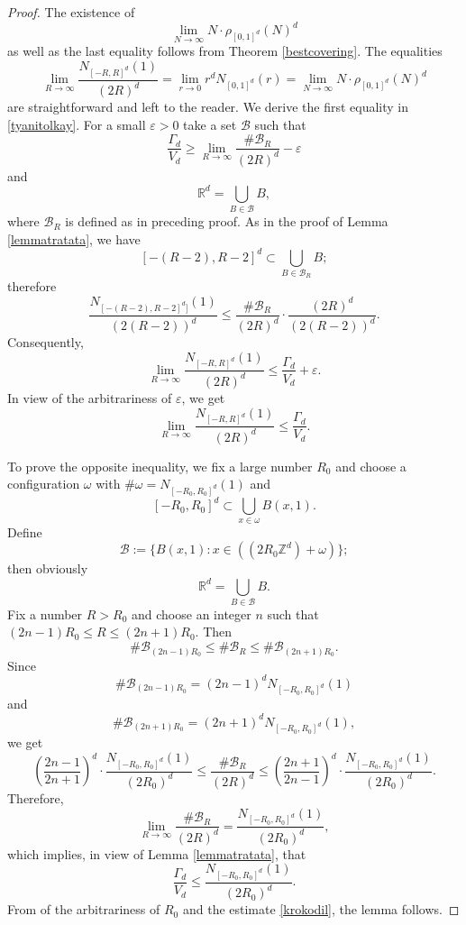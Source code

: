 \documentclass[12pt]{amsart}
\theoremstyle{definition}
\def\R{\mathbb{R}}
\def\ep{\varepsilon}
\newcommand{\1}{\mathbf{1}}
\begin{document}
\begin{proof}
The existence of 
$$
\lim_{N\to \infty} N\cdot \rho_{[0,1]^d}(N)^d
$$
as well as the last equality follows from Theorem \ref{bestcovering}. The equalities
$$
\lim_{R\to \infty} \frac{N_{[-R, R]^d}(1)}{(2R)^d} = \lim_{r\to 0} r^d N_{[0,1]^d}(r) = \lim_{N\to \infty} N\cdot \rho_{[0,1]^d}(N)^d
$$
are straightforward and left to the reader. We derive the first equality in \eqref{tyanitolkay}. For a small $\ep>0$ take a set $\mathcal{B}$ such that 
$$
\frac{\Gamma_d}{V_d}\geqslant \lim_{R\to \infty}\frac{\#\mathcal{B}_R}{(2R)^d} - \ep
$$
and 
$$
\R^d = \bigcup_{B\in \mathcal{B}} B,
$$ 
where $\mathcal{B}_R$ is defined as in preceding proof. As in the proof of Lemma \ref{lemmatratata}, we have
$$
[-(R-2), R-2]^d\subset \bigcup_{B\in \mathcal{B}_R} B;
$$
therefore
$$
\frac{N_{[-(R-2), R-2]^d]}(1)}{(2(R-2))^d}\leqslant \frac{\#\mathcal{B}_R}{(2R)^d}\cdot \frac{(2R)^d}{(2(R-2))^d}.
$$
Consequently,
$$
\lim_{R\to \infty} \frac{N_{[-R, R]^d}(1)}{(2R)^d} \leqslant \frac{\Gamma_d}{V_d}+\ep.
$$
In view of the arbitrariness of $\ep$, we get 
\begin{equation}\label{krokodil}
\lim_{R\to \infty} \frac{N_{[-R, R]^d}(1)}{(2R)^d} \leqslant \frac{\Gamma_d}{V_d}.
\end{equation}

To prove the opposite inequality, we fix a large number $R_0$ and choose a configuration $\omega$ with $\#\omega = N_{[-R_0, R_0]^d}(1)$ and
$$
[-R_0,R_0]^d\subset \bigcup_{x\in \omega}B(x, 1).
$$
Define
$$
\mathcal{B}:=\{B(x,1)\colon  x\in((2R_0\mathbb{Z}^d)+\omega)\};
$$
then obviously
$$
\R^d=\bigcup_{B\in \mathcal{B}} B.
$$
Fix a number $R>R_0$ and choose an integer $n$ such that $(2n-1)R_0\leqslant R \leqslant (2n+1)R_0$. Then
$$
\#\mathcal{B}_{(2n-1)R_0}\leqslant \#\mathcal{B}_R\leqslant \#\mathcal{B}_{(2n+1)R_0}.
$$
Since
$$
\#\mathcal{B}_{(2n-1)R_0} = (2n-1)^d N_{[-R_0, R_0]^d}(1)
$$
and
$$
\#\mathcal{B}_{(2n+1)R_0} = (2n+1)^d N_{[-R_0, R_0]^d}(1),
$$
we get
$$
\left(\frac{2n-1}{2n+1}\right)^d \cdot \frac{N_{[-R_0, R_0]^d}(1)}{(2R_0)^d} \leqslant \frac{\#\mathcal{B}_R}{(2R)^d} \leqslant \left(\frac{2n+1}{2n-1}\right)^d \cdot \frac{N_{[-R_0, R_0]^d}(1)}{(2R_0)^d}.
$$
Therefore, 
$$
\lim_{R\to\infty} \frac{\#\mathcal{B}_R}{(2R)^d} = \frac{N_{[-R_0, R_0]^d}(1)}{(2R_0)^d},
$$
which implies, in view of Lemma \ref{lemmatratata}, that
$$
\frac{\Gamma_d}{V_d}\leqslant \frac{N_{[-R_0, R_0]^d}(1)}{(2R_0)^d}.
$$
From of the arbitrariness of $R_0$ and the estimate \eqref{krokodil}, the lemma follows. 
\end{proof}


\end{document}
